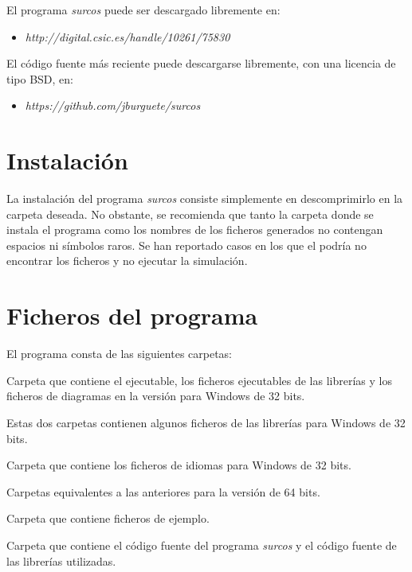 El programa \emph{surcos} puede ser descargado libremente en:
\begin{itemize}
\item \textit{http://digital.csic.es/handle/10261/75830}
\end{itemize}
El código fuente más reciente puede descargarse libremente, con una licencia de
tipo BSD, en:
\begin{itemize}
\item \textit{https://github.com/jburguete/surcos}
\end{itemize}

\section{Instalación}

La instalación del programa \emph{surcos} consiste simplemente en descomprimirlo
en la carpeta deseada. No obstante, se recomienda que tanto la carpeta donde se
instala el programa como los nombres de los ficheros generados no contengan
espacios ni símbolos raros. Se han reportado casos en los que el podría no
encontrar los ficheros y no ejecutar la simulación.

\section{Ficheros del programa}

El programa consta de las siguientes carpetas:
\begin{description}
\item[win32/bin]
\item Carpeta que contiene el ejecutable, los ficheros ejecutables de las
librerías y los ficheros de diagramas en la versión para Windows de 32 bits.
\item[win32/etc]
\item[win32/lib]
\item Estas dos carpetas contienen algunos ficheros de las librerías para
Windows de 32 bits.
\item[win32/share]
\item Carpeta que contiene los ficheros de idiomas para Windows de 32 bits.
\item[win64/bin]
\item[win64/etc]
\item[win64/lib]
\item[win64/share]
\item Carpetas equivalentes a las anteriores para la versión de 64 bits.
\item[examples]
\item Carpeta que contiene ficheros de ejemplo.
\item[src]
\item Carpeta que contiene el código fuente del programa \emph{surcos} y el
código fuente de las librerías utilizadas.
\end{description}

